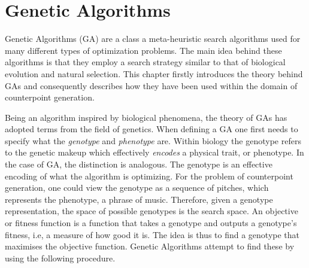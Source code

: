 \documentclass[master.tex]{subfiles}
\begin{document}
\section{Genetic Algorithms}
Genetic Algorithms (GA) are a class a meta-heuristic search algorithms used for many different types of optimization problems. The main idea behind these algorithms is that they employ a search strategy similar to that of biological evolution and natural selection. This chapter firstly introduces the theory behind GAs and consequently describes how they have been used within the domain of counterpoint generation. 

Being an algorithm inspired by biological phenomena, the theory of GAs has adopted terms from the field of genetics. When defining a GA one first needs to specify what the \emph{genotype} and \emph{phenotype} are. Within biology the genotype refers to the genetic makeup which effectively \emph{encodes} a physical trait, or phenotype. In the case of GA, the distinction is analogous. The genotype is an effective encoding of what the algorithm is optimizing. For the problem of counterpoint generation, one could view the genotype as a sequence of pitches, which represents the phenotype, a phrase of music. Therefore, given a genotype representation, the space of possible genotypes is the search space. An objective or fitness function is a function that takes a genotype and outputs a genotype's fitness, i.e, a measure of how good it is. The idea is thus to find a genotype that maximises the objective function. Genetic Algorithms attempt to find these by using the following procedure. 
\end{document}
